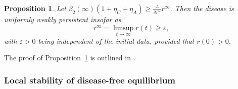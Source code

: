 \documentclass{my_aims}
\newtheorem{proposition}[theorem]{Proposition}
\theoremstyle{definition}
\begin{document}
\begin{proposition}
\label{prop:persistent}
Let $\beta_2(\infty) (1 + \eta_C + \eta_A) \geq \frac{\Lambda}{N^\infty} r^\infty$.
Then the disease is uniformly weakly persistent insofar as
\begin{equation*}
r^\infty = \limsup_{t \to \infty} r(t) \geq \varepsilon,
\end{equation*}
with $\varepsilon > 0$ being independent of the initial data, provided that $r(0) > 0$.
\end{proposition}

The proof of Proposition~\ref{prop:persistent} is outlined in \cite{Thieme:1993}.

\subsubsection{Local stability of disease-free equilibrium}
\label{sec:DFE:HIVmodel}
\end{document}
